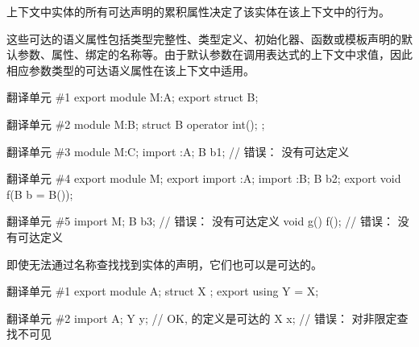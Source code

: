\pnum
上下文中实体的所有可达声明的累积属性决定了该实体在该上下文中的行为。
\begin{note}
这些可达的语义属性包括类型完整性、类型定义、初始化器、函数或模板声明的默认参数、属性、绑定的名称等。由于默认参数在调用表达式的上下文中求值，因此相应参数类型的可达语义属性在该上下文中适用。
\begin{example}
\begin{codeblocktu}{翻译单元 \#1}
export module M:A;
export struct B;
\end{codeblocktu}

\begin{codeblocktu}{翻译单元 \#2}
module M:B;
struct B {
  operator int();
};
\end{codeblocktu}

\begin{codeblocktu}{翻译单元 \#3}
module M:C;
import :A;
B b1;                           // 错误： 没有可达定义
\end{codeblocktu}

\begin{codeblocktu}{翻译单元 \#4}
export module M;
export import :A;
import :B;
B b2;
export void f(B b = B());
\end{codeblocktu}

\begin{codeblocktu}{翻译单元 \#5}
import M;
B b3;                           // 错误： 没有可达定义
void g() { f(); }               // 错误： 没有可达定义
\end{codeblocktu}
\end{example}
\end{note}

\pnum
\begin{note}
即使无法通过名称查找找到实体的声明，它们也可以是可达的。
\end{note}
\begin{example}
\begin{codeblocktu}{翻译单元 \#1}
export module A;
struct X {};
export using Y = X;
\end{codeblocktu}

\begin{codeblocktu}{翻译单元 \#2}
import A;
Y y;                // OK,  的定义是可达的
X x;                // 错误： 对非限定查找不可见
\end{codeblocktu}
\end{example}
